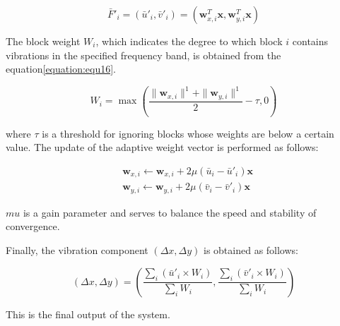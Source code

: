 \begin{equation}
  \label{equ:}
  \bar F'_i=(\bar u'_i,\bar v'_i) = (\bm{w}_{x,i}^T\bm{x} , \bm{w}_{y,i}^T\bm{x})
\end{equation}


 

The block weight $W_i$, which indicates the degree
to which block $i$ contains vibrations in the specified frequency band,
is obtained from the equation\eqref{equation:equ16}.


 
 \begin{equation}
   \label{equation:equ16}
   W_i = \max \left(
   \frac{ \|\bm{w}_{x,i}\|^1 + \|\bm{w}_{y,i}\|^1 }{2} - \tau ,0
   \right)
   \end{equation}


 where $\tau$ is a threshold for ignoring blocks whose weights are below a certain value.
 The update of the adaptive weight vector is performed as follows:
 
\begin{align}
  &\bm{w}_{x,i} \leftarrow
  \bm{w}_{x,i} + 2\mu(\bar u_i - \bar u'_i)\bm{x} \\
  &\bm{w}_{y,i} \leftarrow
  \bm{w}_{y,i} + 2\mu(\bar v_i - \bar v'_i)\bm{x}
\end{align}


$mu$ is a gain parameter and serves to balance the speed and stability of convergence.
 
Finally, the vibration component $(\Delta x , \Delta y)$ is obtained as follows:

 \begin{equation}
   \label{equation:equ17}
   (\Delta x , \Delta y) = \left(
   \frac{\sum_i ( \bar u'_i \times W_i )}{\sum_i W_i} , \frac{\sum_i ( \bar v'_i \times W_i )}{\sum_i W_i}
   \right)
 \end{equation}

 This is the final output of the system.
